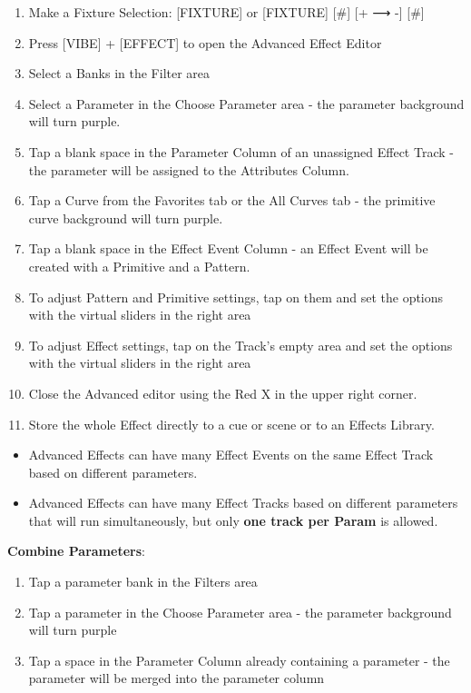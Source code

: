 \documentclass[
]{article}
\begin{document}
\begin{enumerate}
\def\labelenumi{\arabic{enumi}.}
\item
  Make a Fixture Selection: {[}FIXTURE{]} or {[}FIXTURE{]} {[}\#{]} {[}+ ⟶ -{]} {[}\#{]}
\item
  Press {[}VIBE{]} + {[}EFFECT{]} to open the Advanced Effect Editor
\item
  Select a Banks in the Filter area
\item
  Select a Parameter in the Choose Parameter area - the parameter background will turn purple.
\item
  Tap a blank space in the Parameter Column of an unassigned Effect Track - the parameter will be assigned to the Attributes Column.
\item
  Tap a Curve from the Favorites tab or the All Curves tab - the primitive curve background will turn purple.
\item
  Tap a blank space in the Effect Event Column - an Effect Event will be created with a Primitive and a Pattern.
\item
  To adjust Pattern and Primitive settings, tap on them and set the options with the virtual sliders in the right area
\item
  To adjust Effect settings, tap on the Track's empty area and set the options with the virtual sliders in the right area
\item
  Close the Advanced editor using the Red X in the upper right corner.
\item
  Store the whole Effect directly to a cue or scene or to an Effects Library.
\end{enumerate}

\begin{itemize}
\item
  Advanced Effects can have many Effect Events on the same Effect Track based on different parameters.
\item
  Advanced Effects can have many Effect Tracks based on different parameters that will run simultaneously, but only \textbf{one track per Param} is allowed.
\end{itemize}

\textbf{Combine Parameters}:

\begin{enumerate}
\def\labelenumi{\arabic{enumi}.}
\item
  Tap a parameter bank in the Filters area
\item
  Tap a parameter in the Choose Parameter area - the parameter background will turn purple
\item
  Tap a space in the Parameter Column already containing a parameter - the parameter will be merged into the parameter column
\end{enumerate}
\end{document}
